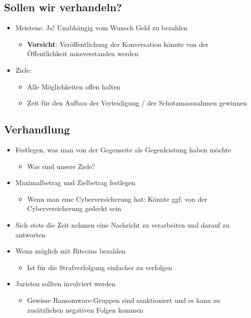 \subsection{Sollen wir verhandeln?}
\begin{itemize}
    \item Meistens: Ja! Unabhängig vom Wunsch Geld zu bezahlen
    \begin{itemize}
        \item \textbf{Vorsicht}: Veröffentlichung der Konversation könnte von der Öffentlichkeit missverstanden werden
    \end{itemize}
    \item Ziele:
    \begin{itemize}
        \item Alle Möglichkeiten offen halten
        \item Zeit für den Aufbau der Verteidigung / der Schutzmassnahmen gewinnen
    \end{itemize}
\end{itemize}

\subsection{Verhandlung}
\begin{itemize}
    \item Festlegen, was man von der Gegenseite als Gegenleistung haben möchte
    \begin{itemize}
        \item Was sind unsere Ziele?
    \end{itemize}
    \item Maximalbetrag und Zielbetrag festlegen
    \begin{itemize}
        \item Wenn man eine Cyberversicherung hat: Könnte ggf. von der Cyberversicherung gedeckt sein
    \end{itemize}
    \item Sich stets die Zeit nehmen eine Nachricht zu verarbeiten und darauf zu antworten
    \item Wenn möglich mit Bitcoins bezahlen
    \begin{itemize}
        \item Ist für die Strafverfolgung einfacher zu verfolgen
    \end{itemize}
    \item Juristen sollten involviert werden
    \begin{itemize}
        \item Gewisse Ransomware-Gruppen sind sanktioniert und es kann zu zusätzlichen negativen Folgen kommen
    \end{itemize}
\end{itemize}

